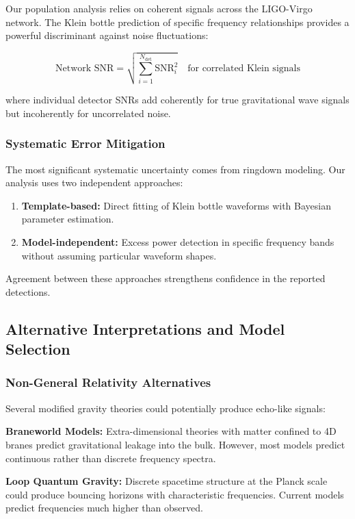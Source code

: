 \documentclass[reprint,amsmath,amssymb,aps,prd]{revtex4-2}
\begin{document}
Our population analysis relies on coherent signals across the LIGO-Virgo network. The Klein bottle prediction of specific frequency relationships provides a powerful discriminant against noise fluctuations:

\begin{equation}
\text{Network SNR} = \sqrt{\sum_{i=1}^{N_{\text{det}}} \text{SNR}_i^2} \quad \text{for correlated Klein signals}
\end{equation}

where individual detector SNRs add coherently for true gravitational wave signals but incoherently for uncorrelated noise.

\subsubsection{Systematic Error Mitigation}

The most significant systematic uncertainty comes from ringdown modeling. Our analysis uses two independent approaches:

\begin{enumerate}
\item \textbf{Template-based:} Direct fitting of Klein bottle waveforms with Bayesian parameter estimation.
\item \textbf{Model-independent:} Excess power detection in specific frequency bands without assuming particular waveform shapes.
\end{enumerate}

Agreement between these approaches strengthens confidence in the reported detections.

\subsection{Alternative Interpretations and Model Selection}

\subsubsection{Non-General Relativity Alternatives}

Several modified gravity theories could potentially produce echo-like signals:

\textbf{Braneworld Models:} Extra-dimensional theories with matter confined to 4D branes predict gravitational leakage into the bulk. However, most models predict continuous rather than discrete frequency spectra.

\textbf{Loop Quantum Gravity:} Discrete spacetime structure at the Planck scale could produce bouncing horizons with characteristic frequencies. Current models predict frequencies much higher than observed.
\end{document}

